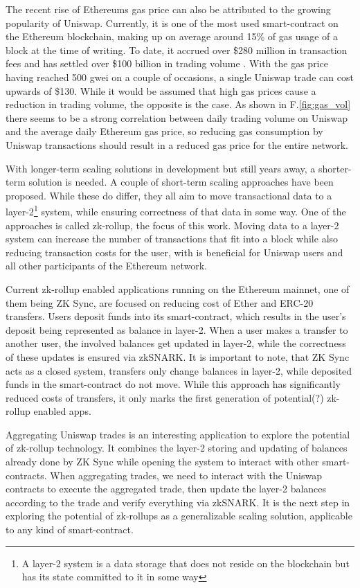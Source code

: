 \documentclass[11pt,twoside,a4paper,final]{book}
\begin{document}
The recent rise of Ethereums gas price \cite{gasprice} can also be attributed to the growing popularity of Uniswap. Currently, it is one of the most used smart-contract on the Ethereum blockchain, making up on average around 15\% of gas \cite{eth_gas_guzzlers} usage of a block at the time of writing. To date, it accrued over \$280 million in transaction fees \cite{uniswap_tx_fees} and has settled over \$100 billion in trading volume \cite{cummulative_vol}. With the gas price having reached 500 gwei on a couple of occasions, a single Uniswap trade can cost upwards of \$130. While it would be assumed that high gas prices cause a reduction in trading volume, the opposite is the case. As shown in F.\ref{fig:gas_vol} there seems to be a strong correlation between daily trading volume on Uniswap and the average daily Ethereum gas price, so reducing gas consumption by Uniswap transactions should result in a reduced gas price for the entire network.

With longer-term scaling solutions in development but still years away, a shorter-term solution is needed. A couple of short-term scaling approaches have been proposed. While these do differ, they all aim to move transactional data to a layer-2\footnote{A layer-2 system is a data storage that does not reside on the blockchain but has its state committed to it in some way} system, while ensuring correctness of that data in some way. One of the approaches is called zk-rollup, the focus of this work. Moving data to a layer-2 system can increase the number of transactions that fit into a block while also reducing transaction costs for the user, with is beneficial for Uniswap users and all other participants of the Ethereum network. 

Current zk-rollup enabled applications running on the Ethereum mainnet, one of them being ZK Sync, are focused on reducing cost of Ether and ERC-20 transfers. Users deposit funds into its smart-contract, which results in the user's deposit being represented as balance in layer-2. When a user makes a transfer to another user, the involved balances get updated in layer-2, while the correctness of these updates is ensured via zkSNARK. It is important to note, that ZK Sync acts as a closed system, transfers only change balances in layer-2, while deposited funds in the smart-contract do not move. While this approach has significantly reduced costs of transfers, it only marks the first generation of potential(?) zk-rollup enabled apps.

Aggregating Uniswap trades is an interesting application to explore the potential of zk-rollup technology. It combines the layer-2 storing and updating of balances already done by ZK Sync while opening the system to interact with other smart-contracts. When aggregating trades, we need to interact with the Uniswap contracts to execute the aggregated trade, then update the layer-2 balances according to the trade and verify everything via zkSNARK. It is the next step in exploring the potential of zk-rollups as a generalizable scaling solution, applicable to any kind of smart-contract. 
\end{document}
